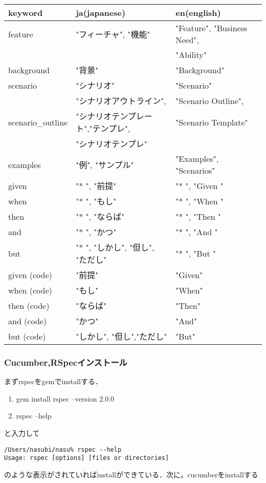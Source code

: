 \begin{table}[htbp]\begin{center}
\caption{}
\begin{tabular}{llll}
\hline
keyword   &ja(japanese)   &en(english)  \\ \hline
 feature  & "フィーチャ", "機能"      &"Feature", "Business Need",   \\
 & &"Ability"     \\
background  &"背景"  &"Background"   \\
scenario  &"シナリオ"        &"Scenario"     \\
 &"シナリオアウトライン",  &"Scenario Outline",  \\
 scenario\_outline   &"シナリオテンプレート","テンプレ",  & "Scenario Template"   \\
 &"シナリオテンプレ"   & \\
examples  &"例", "サンプル"   &"Examples", "Scenarios"          \\
given   &"* ", "前提"        &"* ", "Given "          \\
when   &"* ", "もし"        &"* ", "When "  \\
then   &"* ", "ならば"       &"* ", "Then "  \\
and    &"* ", "かつ"        &"* ", "And "   \\
but    &"* ", "しかし", "但し", "ただし"  &"* ", "But "   \\
given (code)   &"前提"   &"Given"        \\
when (code)   &"もし"     &"When"         \\
then (code)   &"ならば"   &"Then"         \\
and (code)    &"かつ"     &"And"          \\
but (code)    &"しかし", "但し","ただし"   &"But"          \\
\hline
\end{tabular}
\label{default}
\end{center}\end{table}

\subsubsection{Cucumber,RSpecインストール}
まずrspecをgemでinstallする．

\begin{enumerate}
\item gem install rspec --version 2.0.0
\item rspec --help
\end{enumerate}
と入力して
\begin{lstlisting}[style=customCsh,basicstyle={\scriptsize\ttfamily}]
/Users/nasubi/nasu% rspec --help
Usage: rspec [options] [files or directories]
\end{lstlisting}
のような表示がされていればinstallができている．次に，cucumberをinstallする

